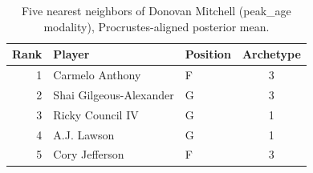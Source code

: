 \begin{table}[htbp]
  \centering\small
  \begin{tabular}{rllc}
    \toprule
    Rank & Player & Position & Archetype \\
    \midrule
    1 & Carmelo Anthony & F & 3 \\
    2 & Shai Gilgeous-Alexander & G & 3 \\
    3 & Ricky Council IV & G & 1 \\
    4 & A.J. Lawson & G & 1 \\
    5 & Cory Jefferson & F & 3 \\
    \bottomrule
  \end{tabular}
  \caption{Five nearest neighbors of Donovan Mitchell (peak_age modality), Procrustes-aligned posterior mean.}
  \label{tab:Donovan_Mitchell_neighbors_peak_age}
\end{table}

